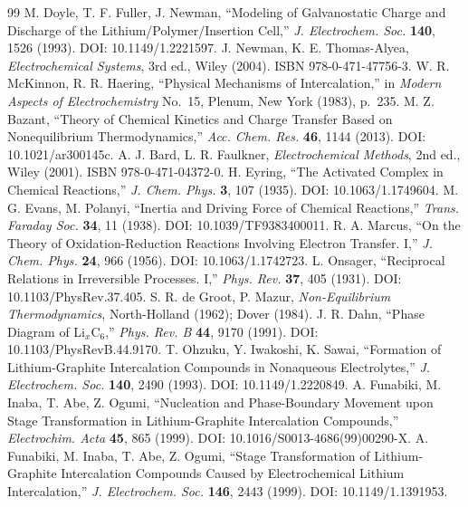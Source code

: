 \documentclass[11pt,a4paper]{article}
\begin{document}
\begin{thebibliography}{99}
 M. Doyle, T. F. Fuller, J. Newman, ``Modeling of Galvanostatic Charge and Discharge of the Lithium/Polymer/Insertion Cell,'' \emph{J. Electrochem. Soc.} \textbf{140}, 1526 (1993). DOI: 10.1149/1.2221597.
 J. Newman, K. E. Thomas-Alyea, \emph{Electrochemical Systems}, 3rd ed., Wiley (2004). ISBN 978-0-471-47756-3.
 W. R. McKinnon, R. R. Haering, ``Physical Mechanisms of Intercalation,'' in \emph{Modern Aspects of Electrochemistry} No.~15, Plenum, New York (1983), p.~235.
 M. Z. Bazant, ``Theory of Chemical Kinetics and Charge Transfer Based on Nonequilibrium Thermodynamics,'' \emph{Acc. Chem. Res.} \textbf{46}, 1144 (2013). DOI: 10.1021/ar300145c.
 A. J. Bard, L. R. Faulkner, \emph{Electrochemical Methods}, 2nd ed., Wiley (2001). ISBN 978-0-471-04372-0.
 H. Eyring, ``The Activated Complex in Chemical Reactions,'' \emph{J. Chem. Phys.} \textbf{3}, 107 (1935). DOI: 10.1063/1.1749604.
 M. G. Evans, M. Polanyi, ``Inertia and Driving Force of Chemical Reactions,'' \emph{Trans. Faraday Soc.} \textbf{34}, 11 (1938). DOI: 10.1039/TF9383400011.
 R. A. Marcus, ``On the Theory of Oxidation-Reduction Reactions Involving Electron Transfer. I,'' \emph{J. Chem. Phys.} \textbf{24}, 966 (1956). DOI: 10.1063/1.1742723.
 L. Onsager, ``Reciprocal Relations in Irreversible Processes. I,'' \emph{Phys. Rev.} \textbf{37}, 405 (1931). DOI: 10.1103/PhysRev.37.405.
 S. R. de Groot, P. Mazur, \emph{Non-Equilibrium Thermodynamics}, North-Holland (1962); Dover (1984).
 J. R. Dahn, ``Phase Diagram of Li$_x$C$_6$,'' \emph{Phys. Rev. B} \textbf{44}, 9170 (1991). DOI: 10.1103/PhysRevB.44.9170.
 T. Ohzuku, Y. Iwakoshi, K. Sawai, ``Formation of Lithium-Graphite Intercalation Compounds in Nonaqueous Electrolytes,'' \emph{J. Electrochem. Soc.} \textbf{140}, 2490 (1993). DOI: 10.1149/1.2220849.
 A. Funabiki, M. Inaba, T. Abe, Z. Ogumi, ``Nucleation and Phase-Boundary Movement upon Stage Transformation in Lithium-Graphite Intercalation Compounds,'' \emph{Electrochim. Acta} \textbf{45}, 865 (1999). DOI: 10.1016/S0013-4686(99)00290-X.
 A. Funabiki, M. Inaba, T. Abe, Z. Ogumi, ``Stage Transformation of Lithium-Graphite Intercalation Compounds Caused by Electrochemical Lithium Intercalation,'' \emph{J. Electrochem. Soc.} \textbf{146}, 2443 (1999). DOI: 10.1149/1.1391953.

\end{thebibliography}
\end{document}
